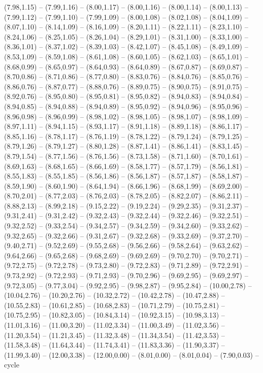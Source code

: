 {(7.98,1.15) -- (7.99,1.16) -- (8.00,1.17) -- (8.00,1.16) -- (8.00,1.14) -- (8.00,1.13) -- (7.99,1.12) -- (7.99,1.10) -- (7.99,1.09) -- (8.00,1.08) -- (8.02,1.08) -- (8.04,1.09) -- (8.07,1.10) -- (8.14,1.09) -- (8.16,1.09) -- (8.20,1.11) -- (8.22,1.11) -- (8.23,1.10) -- (8.24,1.06) -- (8.25,1.05) -- (8.26,1.04) -- (8.29,1.01) -- (8.31,1.00) -- (8.33,1.00) -- (8.36,1.01) -- (8.37,1.02) -- (8.39,1.03) -- (8.42,1.07) -- (8.45,1.08) -- (8.49,1.09) -- (8.53,1.09) -- (8.59,1.08) -- (8.61,1.08) -- (8.60,1.05) -- (8.62,1.03) -- (8.65,1.01) -- (8.68,0.99) -- (8.65,0.97) -- (8.64,0.93) -- (8.64,0.89) -- (8.67,0.87) -- (8.69,0.87) -- (8.70,0.86) -- (8.71,0.86) -- (8.77,0.80) -- (8.83,0.76) -- (8.84,0.76) -- (8.85,0.76) -- (8.86,0.76) -- (8.87,0.77) -- (8.88,0.76) -- (8.89,0.75) -- (8.90,0.75) -- (8.91,0.75) -- (8.92,0.76) -- (8.95,0.80) -- (8.95,0.81) -- (8.95,0.82) -- (8.94,0.83) -- (8.94,0.84) -- (8.94,0.85) -- (8.94,0.88) -- (8.94,0.89) -- (8.95,0.92) -- (8.94,0.96) -- (8.95,0.96) -- (8.96,0.98) -- (8.96,0.99) -- (8.98,1.02) -- (8.98,1.05) -- (8.98,1.07) -- (8.98,1.09) -- (8.97,1.11) -- (8.94,1.15) -- (8.93,1.17) -- (8.91,1.18) -- (8.89,1.18) -- (8.86,1.17) -- (8.85,1.16) -- (8.78,1.17) -- (8.76,1.19) -- (8.78,1.22) -- (8.79,1.24) -- (8.79,1.25) -- (8.79,1.26) -- (8.79,1.27) -- (8.80,1.28) -- (8.87,1.41) -- (8.86,1.41) -- (8.83,1.45) -- (8.79,1.54) -- (8.77,1.56) -- (8.76,1.56) -- (8.73,1.58) -- (8.71,1.60) -- (8.70,1.61) -- (8.69,1.63) -- (8.68,1.65) -- (8.66,1.69) -- (8.58,1.77) -- (8.57,1.79) -- (8.56,1.81) -- (8.55,1.83) -- (8.55,1.85) -- (8.56,1.86) -- (8.56,1.87) -- (8.57,1.87) -- (8.58,1.87) -- (8.59,1.90) -- (8.60,1.90) -- (8.64,1.94) -- (8.66,1.96) -- (8.68,1.99) -- (8.69,2.00) -- (8.70,2.01) -- (8.77,2.03) -- (8.76,2.03) -- (8.78,2.05) -- (8.82,2.07) -- (8.86,2.11) -- (8.88,2.13) -- (8.99,2.18) -- (9.15,2.22) -- (9.19,2.24) -- (9.29,2.35) -- (9.31,2.37) -- (9.31,2.41) -- (9.31,2.42) -- (9.32,2.43) -- (9.32,2.44) -- (9.32,2.46) -- (9.32,2.51) -- (9.32,2.52) -- (9.33,2.54) -- (9.34,2.57) -- (9.34,2.59) -- (9.34,2.60) -- (9.33,2.62) -- (9.32,2.65) -- (9.32,2.66) -- (9.31,2.67) -- (9.32,2.68) -- (9.33,2.69) -- (9.37,2.70) -- (9.40,2.71) -- (9.52,2.69) -- (9.55,2.68) -- (9.56,2.66) -- (9.58,2.64) -- (9.63,2.62) -- (9.64,2.66) -- (9.65,2.68) -- (9.68,2.69) -- (9.69,2.69) -- (9.70,2.70) -- (9.70,2.71) -- (9.72,2.75) -- (9.72,2.78) -- (9.73,2.80) -- (9.72,2.83) -- (9.71,2.89) -- (9.72,2.91) -- (9.73,2.92) -- (9.72,2.93) -- (9.71,2.93) -- (9.70,2.96) -- (9.69,2.95) -- (9.69,2.97) -- (9.72,3.05) -- (9.77,3.04) -- (9.92,2.95) -- (9.98,2.87) -- (9.95,2.84) -- (10.00,2.78) -- (10.04,2.76) -- (10.20,2.76) -- (10.32,2.72) -- (10.42,2.78) -- (10.47,2.88) -- (10.55,2.83) -- (10.61,2.85) -- (10.68,2.83) -- (10.71,2.79) -- (10.75,2.81) -- (10.75,2.95) -- (10.82,3.05) -- (10.84,3.14) -- (10.92,3.15) -- (10.98,3.13) -- (11.01,3.16) -- (11.00,3.20) -- (11.02,3.34) -- (11.00,3.49) -- (11.02,3.56) -- (11.20,3.54) -- (11.21,3.45) -- (11.32,3.48) -- (11.34,3.54) -- (11.42,3.53) -- (11.58,3.48) -- (11.64,3.44) -- (11.74,3.41) -- (11.83,3.36) -- (11.90,3.37) -- (11.99,3.40) -- (12.00,3.38) -- (12.00,0.00) -- (8.01,0.00) -- (8.01,0.04) -- (7.90,0.03) -- cycle}
